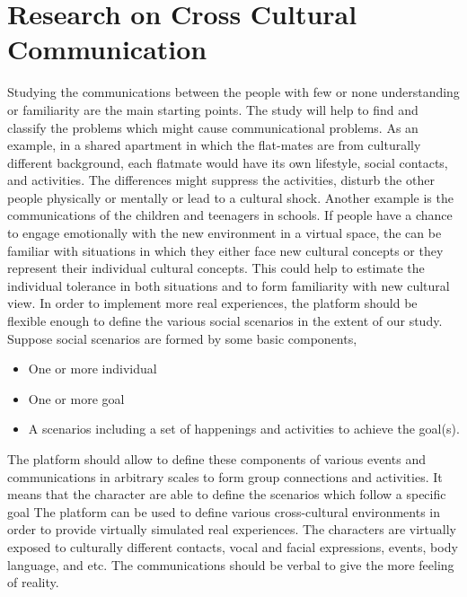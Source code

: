 \documentclass[conference]{IEEEtran}
\begin{document}
\section{Research on Cross Cultural Communication}

Studying the 
communications between the people with few or none understanding or familiarity are the main
starting points. The study will help to find and classify the problems which might cause 
communicational problems. As an example, in a shared apartment in which the flat-mates are from culturally different background, each flatmate would have its own lifestyle, social contacts, and activities. The differences might suppress the activities, disturb the other people physically or mentally or lead to a cultural shock. Another example is the communications of the children and teenagers in schools. If people have a chance to engage emotionally with the new environment in a virtual space, the can be familiar with situations in which they either face new cultural concepts or they represent their individual cultural concepts. This could help to estimate the individual tolerance in both situations and to form familiarity with new cultural view. 
In order to implement 
more real experiences, the platform should be flexible enough to define the 
various social scenarios in the extent of our study.
Suppose social scenarios are formed by some basic components,
\begin{itemize}
\item One or more individual
\item One or more goal
\item A scenarios including a set of happenings and activities to achieve the goal(s).
\end{itemize}

The platform should allow to define these components of various events and communications in 
arbitrary scales to form group connections and activities. It means that the character are able to define the scenarios which follow a specific goal
The platform can be used to define various cross-cultural environments in order to
provide virtually simulated real experiences. The characters are virtually exposed to culturally
different contacts, vocal and facial expressions, events, body language, and etc.
The communications should be verbal to give the more feeling of reality. 

\end{document}
